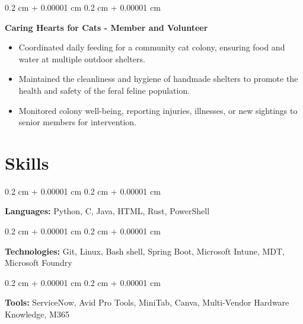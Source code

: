 \documentclass[10pt, letterpaper]{article}
\newenvironment{highlights}{
    \begin{itemize}[
        topsep=0.10 cm,
        parsep=0.10 cm,
        partopsep=0pt,
        itemsep=0pt,
        leftmargin=0.4 cm + 10pt
    ]
}{
    \end{itemize}
} %
\newenvironment{onecolentry}{
    \begin{adjustwidth}{
        0.2 cm + 0.00001 cm
    }{
        0.2 cm + 0.00001 cm
    }
}{
    \end{adjustwidth}
} %
\begin{document}
        \begin{onecolentry}
            \textbf{Caring Hearts for Cats - Member and Volunteer}
            \begin{highlights}
            \item Coordinated daily feeding for a community cat colony, ensuring food and water at multiple outdoor shelters.
            \item Maintained the cleanliness and hygiene of handmade shelters to promote the health and safety of the feral feline population.
            \item Monitored colony well-being, reporting injuries, illnesses, or new sightings to senior members for intervention.
            \end{highlights}
        \end{onecolentry}

        \endgroup
    
    \section{Skills}
        \begin{onecolentry}
            \textbf{Languages:} Python, C, Java, HTML, Rust, PowerShell \end{onecolentry}      
                \vspace{0.1 cm}
        \begin{onecolentry}
            \textbf{Technologies:} Git, Linux, Bash shell, Spring Boot, Microsoft Intune, MDT, Microsoft Foundry \end{onecolentry}
                \vspace{0.1 cm}
        \begin{onecolentry}
            \textbf{Tools:} ServiceNow, Avid Pro Tools, MiniTab, Canva, Multi-Vendor Hardware Knowledge, M365 \end{onecolentry}
        \vspace{0.05 cm}


   




    
\end{document}
